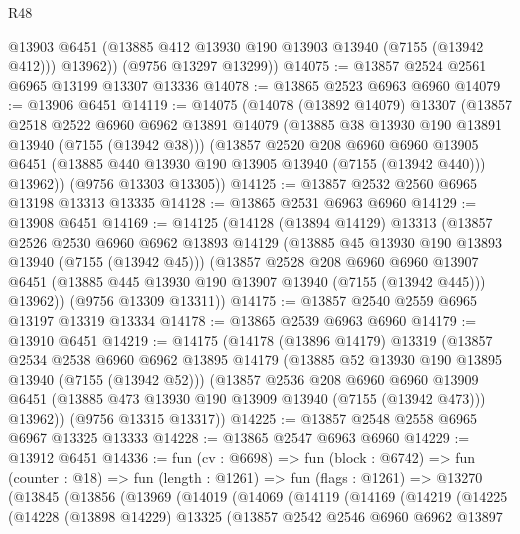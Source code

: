 \begin{lexlean}{R48}
\begin{coremodule}
          @13903
          @6451
          (@13885 @412 @13930 @190 @13903 @13940 (@7155 (@13942 @412)))
          @13962))
      (@9756 @13297 @13299))
@14075 := @13857 @2524 @2561 @6965 @13199 @13307 @13336
@14078 := @13865 @2523 @6963 @6960
@14079 := @13906 @6451
@14119 := @14075
    (@14078
      (@13892 @14079)
      @13307
      (@13857
        @2518
        @2522
        @6960
        @6962
        @13891
        @14079
        (@13885 @38 @13930 @190 @13891 @13940 (@7155 (@13942 @38)))
        (@13857
          @2520
          @208
          @6960
          @6960
          @13905
          @6451
          (@13885 @440 @13930 @190 @13905 @13940 (@7155 (@13942 @440)))
          @13962))
      (@9756 @13303 @13305))
@14125 := @13857 @2532 @2560 @6965 @13198 @13313 @13335
@14128 := @13865 @2531 @6963 @6960
@14129 := @13908 @6451
@14169 := @14125
    (@14128
      (@13894 @14129)
      @13313
      (@13857
        @2526
        @2530
        @6960
        @6962
        @13893
        @14129
        (@13885 @45 @13930 @190 @13893 @13940 (@7155 (@13942 @45)))
        (@13857
          @2528
          @208
          @6960
          @6960
          @13907
          @6451
          (@13885 @445 @13930 @190 @13907 @13940 (@7155 (@13942 @445)))
          @13962))
      (@9756 @13309 @13311))
@14175 := @13857 @2540 @2559 @6965 @13197 @13319 @13334
@14178 := @13865 @2539 @6963 @6960
@14179 := @13910 @6451
@14219 := @14175
    (@14178
      (@13896 @14179)
      @13319
      (@13857
        @2534
        @2538
        @6960
        @6962
        @13895
        @14179
        (@13885 @52 @13930 @190 @13895 @13940 (@7155 (@13942 @52)))
        (@13857
          @2536
          @208
          @6960
          @6960
          @13909
          @6451
          (@13885 @473 @13930 @190 @13909 @13940 (@7155 (@13942 @473)))
          @13962))
      (@9756 @13315 @13317))
@14225 := @13857 @2548 @2558 @6965 @6967 @13325 @13333
@14228 := @13865 @2547 @6963 @6960
@14229 := @13912 @6451
@14336 := fun (cv : @6698) =>
  fun (block : @6742) =>
  fun (counter : @18) =>
  fun (length : @1261) =>
  fun (flags : @1261) =>
  @13270
    (@13845
      (@13856
        (@13969
          (@14019
            (@14069
              (@14119
                (@14169
                  (@14219
                    (@14225
                      (@14228
                        (@13898 @14229)
                        @13325
                        (@13857
                          @2542
                          @2546
                          @6960
                          @6962
                          @13897

\end{coremodule}
\end{lexlean}
